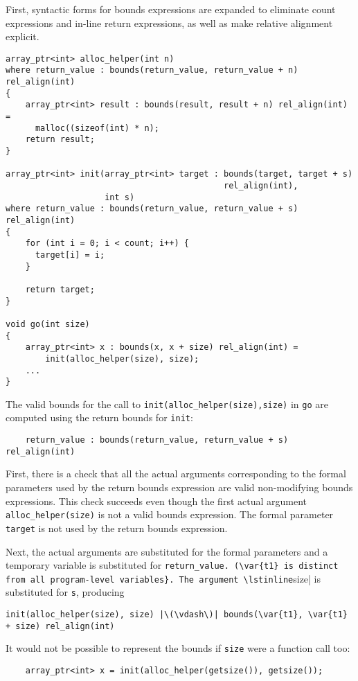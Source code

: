 First, syntactic forms for bounds expressions are expanded to eliminate
count expressions and in-line return expressions, as well as make
relative alignment explicit.

\begin{lstlisting}
array_ptr<int> alloc_helper(int n)
where return_value : bounds(return_value, return_value + n) rel_align(int)
{
    array_ptr<int> result : bounds(result, result + n) rel_align(int) =
      malloc((sizeof(int) * n);
    return result;
}

array_ptr<int> init(array_ptr<int> target : bounds(target, target + s)
                                            rel_align(int), 
                    int s) 
where return_value : bounds(return_value, return_value + s) rel_align(int)
{
    for (int i = 0; i < count; i++) {
      target[i] = i;
    }

    return target;
}

void go(int size) 
{
    array_ptr<int> x : bounds(x, x + size) rel_align(int) = 
        init(alloc_helper(size), size);
    ...
}
\end{lstlisting}

The valid bounds for the call to \lstinline|init(alloc_helper(size),size)| in
\lstinline|go| are computed using the return bounds for \lstinline|init|:

\begin{lstlisting}
    return_value : bounds(return_value, return_value + s) rel_align(int)
\end{lstlisting}

First, there is a check that all the actual arguments corresponding to
the formal parameters used by the return bounds expression are valid
non-modifying bounds expressions. This check succeeds even though the
first actual argument \lstinline|alloc_helper(size)| is not a valid bounds
expression. The formal parameter \lstinline|target| is not used by the
return bounds expression.

Next, the actual arguments are substituted for the formal parameters and
a temporary variable  is substituted for \lstinline|return_value.
(\var{t1} is distinct from all program-level variables}.
The argument \lstinline|size| is substituted for \lstinline|s|, producing
\begin{lstlisting}[escapechar=\|]
    init(alloc_helper(size), size) |\(\vdash\)| bounds(\var{t1}, \var{t1} + size) rel_align(int)
\end{lstlisting}

It would not be possible to represent the bounds if \lstinline|size| were a
function call too:
\begin{lstlisting}
    array_ptr<int> x = init(alloc_helper(getsize()), getsize());
\end{lstlisting}

